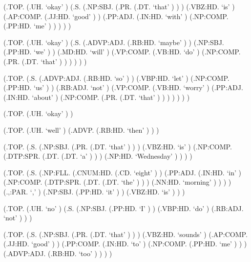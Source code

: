 \documentclass[10pt]{article}
\begin{document}
\begin{parsetree}  (.TOP. (.UH. `okay' ) (.S. (.NP:SBJ. (.PR. (.DT. `that' ) ) ) (.VBZ:HD. `is' ) (.AP:COMP. (.JJ:HD. `good' ) ) (.PP:ADJ. (.IN:HD. `with' ) (.NP:COMP. (.PP:HD. `me' ) ) ) ) ) \end{parsetree}

\begin{parsetree}  (.TOP. (.UH. `okay' ) (.S. (.ADVP:ADJ. (.RB:HD. `maybe' ) ) (.NP:SBJ. (.PP:HD. `we' ) ) (.MD:HD. `will' ) (.VP:COMP. (.VB:HD. `do' ) (.NP:COMP. (.PR. (.DT. `that' ) ) ) ) ) ) \end{parsetree}

\begin{parsetree}  (.TOP. (.S. (.ADVP:ADJ. (.RB:HD. `so' ) ) (.VBP:HD. `let' ) (.NP:COMP. (.PP:HD. `us' ) ) (.RB:ADJ. `not' ) (.VP:COMP. (.VB:HD. `worry' ) (.PP:ADJ. (.IN:HD. `about' ) (.NP:COMP. (.PR. (.DT. `that' ) ) ) ) ) ) ) \end{parsetree}

\begin{parsetree}  (.TOP. (.UH. `okay' ) ) \end{parsetree}

\begin{parsetree}  (.TOP. (.UH. `well' ) (.ADVP. (.RB:HD. `then' ) ) ) \end{parsetree}

\begin{parsetree}  (.TOP. (.S. (.NP:SBJ. (.PR. (.DT. `that' ) ) ) (.VBZ:HD. `is' ) (.NP:COMP. (.DTP:SPR. (.DT. (.DT. `a' ) ) ) (.NP:HD. `Wednesday' ) ) ) ) \end{parsetree}

\begin{parsetree}  (.TOP. (.S. (.NP:FLL. (.CNUM:HD. (.CD. `eight' ) ) (.PP:ADJ. (.IN:HD. `in' ) (.NP:COMP. (.DTP:SPR. (.DT. (.DT. `the' ) ) ) (.NN:HD. `morning' ) ) ) ) (.,:PAR. `,' ) (.NP:SBJ. (.PP:HD. `it' ) ) (.VBZ:HD. `is' ) ) ) \end{parsetree}

\begin{parsetree}  (.TOP. (.UH. `no' ) (.S. (.NP:SBJ. (.PP:HD. `I' ) ) (.VBP:HD. `do' ) (.RB:ADJ. `not' ) ) ) \end{parsetree}

\begin{parsetree}  (.TOP. (.S. (.NP:SBJ. (.PR. (.DT. `that' ) ) ) (.VBZ:HD. `sounds' ) (.AP:COMP. (.JJ:HD. `good' ) ) (.PP:COMP. (.IN:HD. `to' ) (.NP:COMP. (.PP:HD. `me' ) ) ) (.ADVP:ADJ. (.RB:HD. `too' ) ) ) ) \end{parsetree}
\end{document}
